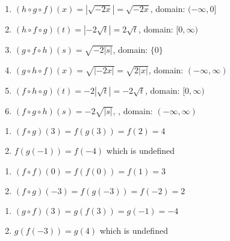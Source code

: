 \begin{enumerate}
\setcounter{enumi}{\value{HW}}

\item $(h\circ g \circ f)(x)= |\sqrt{-2x}|= \sqrt{-2x}$, domain: $(-\infty, 0]$ 

\item $(h\circ f \circ g)(t) = |-2\sqrt{t}|= 2\sqrt{t}$, domain: $[0,\infty)$

\item $(g\circ f \circ h)(s) = \sqrt{-2|s|}$, domain:  $\{0\}$

\item $(g\circ h \circ f)(x) = \sqrt{|-2x|} = \sqrt{2|x|}$, domain: $(-\infty, \infty)$ 

\item $(f\circ h \circ g)(t) = -2|\sqrt{t}| = -2\sqrt{t}$, domain: $[0,\infty)$

\item $(f\circ g \circ h)(s) = -2\sqrt{|s|}$, , domain: $(-\infty,\infty)$

\setcounter{HW}{\value{enumi}}
\end{enumerate}

\begin{multicols}{2}
\begin{enumerate}
\setcounter{enumi}{\value{HW}}

\item $(f \circ g)(3)= f(g(3)) = f(2) = 4$
\item $f(g(-1)) = f(-4)$ which is undefined

\setcounter{HW}{\value{enumi}}
\end{enumerate}
\end{multicols}

\begin{multicols}{2}
\begin{enumerate}
\setcounter{enumi}{\value{HW}}

\item $(f \circ f)(0) = f(f(0)) = f(1) = 3$
\item $(f \circ g)(-3) = f(g(-3)) = f(-2) = 2$

\setcounter{HW}{\value{enumi}}
\end{enumerate}
\end{multicols}

\begin{multicols}{2}
\begin{enumerate}
\setcounter{enumi}{\value{HW}}

\item $(g \circ f)(3) = g(f(3)) = g(-1) = -4$
\item $g(f(-3)) = g(4)$ which is undefined

\setcounter{HW}{\value{enumi}}
\end{enumerate}
\end{multicols}

